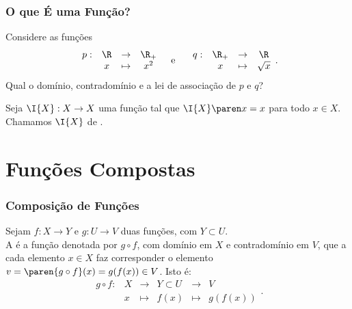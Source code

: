\documentclass[brazil, notheorems, 10pt]{beamer}
\begin{document}
\begin{frame}
\frametitle{O que É uma Função?} %
\begin{exemplo}
Considere as funções
$$\begin{array}{cccc}
p : & \R & \to     & \R_+ \\
		 &  x & \mapsto & x^2
\end{array}
\text{\ \ \  e \ \ \ }
\begin{array}{cccc}
q : & \R_+ & \to     & \R \\
		 &  x & \mapsto & \sqrt x
\end{array}.$$
Qual o domínio, contradomínio e a lei de associação de $p$ e $q$?
\end{exemplo}
\pause

\begin{exemplo}
Seja $\I{X} : X \to X $ uma função tal que $\I{X} \paren x = x$ para
todo $x \in X$. Chamamos $\I{X}$ de .
\end{exemplo}

\end{frame}


\section{Funções Compostas}
\begin{frame}
\frametitle{Composição de Funções} %

\begin{definicao}
Sejam $f: X \to Y$ e $g: U \to V$ duas funções, com $Y \subset U$.\\
A  é a função denotada por $g
\circ f$, com domínio em $X$ e contradomínio em $V$, que a cada
elemento $x \in X$ faz corresponder o elemento $v = \paren{g \circ
f}(x) = g(f(x)) \in V$. Isto é:
$$\begin{array}{cccccc}
g \circ f : & X & \to     & Y \subset U & \to & V \\
		 &  x & \mapsto & f(x) & \mapsto & g(f(x))
\end{array}.$$
\end{definicao}

\end{frame}

\end{document}
